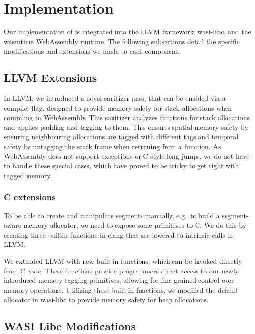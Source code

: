 \chapter{Implementation}
\label{ch:implementation}

Our implementation of \projectname{} is integrated into the LLVM framework, wasi-libc, and the wasmtime WebAssembly runtime.
The following subsections detail the specific modifications and extensions we made to each component.


\section{LLVM Extensions}
\label{sec:llvm}

In LLVM, we introduced a novel sanitizer pass, that can be enabled via a compiler flag, designed to provide memory safety for stack allocations when compiling to WebAssembly.
This sanitizer analyzes functions for stack allocations and applies padding and tagging to them.
This ensures spatial memory safety by ensuring neighbouring allocations are tagged with different tags and temporal safety by untagging the stack frame when returning from a function.
As WebAssembly does not support exceptions or C-style long jumps, we do not have to handle these special cases, which have proved to be tricky to get right with tagged memory.

\subsection{C extensions}
\label{subsec:c-extensions}

To be able to create and manipulate segments manually, e.g.\ to build a segment-aware memory allocator, we need to expose some primitives to C.
We do this by creating three builtin functions in clang that are lowered to intrinsic calls in LLVM.

We extended LLVM with new built-in functions, which can be invoked directly from C code.
These functions provide programmers direct access to our newly introduced memory tagging primitives, allowing for fine-grained control over memory operations.
Utilizing these built-in functions, we modified the default allocator in wasi-libc to provide memory safety for heap allocations.

\section{WASI Libc Modifications}
\label{sec:wasi-libc}

